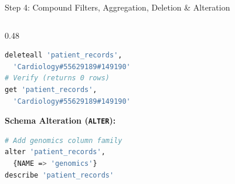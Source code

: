 \documentclass[aspectratio=169]{beamer}
\begin{document}
\begin{frame}[fragile,shrink=3]{Step 4: Compound Filters, Aggregation, Deletion \& Alteration}
\begin{columns}[T]
\begin{column}{0.48\textwidth}
\begin{lstlisting}[language=bash]
deleteall 'patient_records', 
  'Cardiology#55629189#149190'
# Verify (returns 0 rows)
get 'patient_records', 
  'Cardiology#55629189#149190'
            \end{lstlisting}
            \vspace{0.05cm}
            \textbf{\textcolor{AmritaMaroon}{Schema Alteration (\texttt{ALTER}):}}
            \begin{lstlisting}[language=bash]
# Add genomics column family
alter 'patient_records', 
  {NAME => 'genomics'}
describe 'patient_records'
            \end{lstlisting}
        \end{column}
    \end{columns}
\end{frame}

\end{document}
